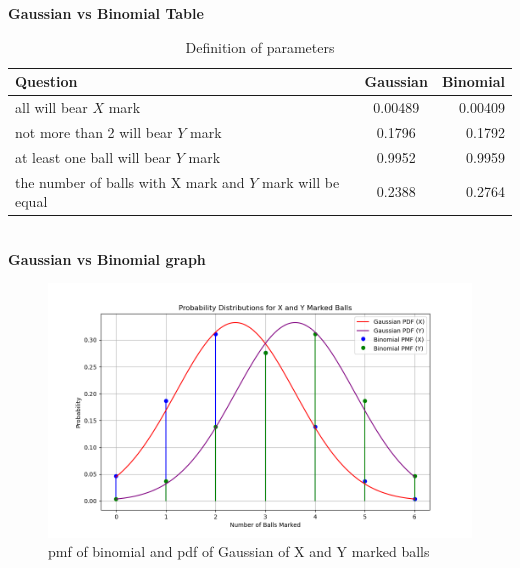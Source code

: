 \documentclass[journal,12pt,twocolumn]{IEEEtran}
\theoremstyle{remark}
\begin{document}
\textbf{Gaussian vs Binomial Table}
\begin{table}[!ht]
\centering
\begin{tabular}{|l|c|r|}
    \hline
    Question & Gaussian & Binomial\\
    \hline
    all will bear $X$ mark & 0.00489 &0.00409\\
    \hline
   not more than 2 will bear $Y$ mark & 0.1796 & 0.1792 \\
    \hline
     at least one ball will bear $Y$ mark &  0.9952& 0.9959 \\
    \hline
    the number of balls with X mark and $Y$ mark will be equal& 0.2388 & 0.2764\\
    \hline
\end{tabular}
\caption{Definition of parameters}
\end{table}
\\
\textbf{Gaussian vs Binomial graph}
\begin{figure}[!ht]
\centering
\includegraphics[width=\columnwidth]{ncert/9/3/17/figs/Fig1.png}
\caption{pmf of binomial and pdf of Gaussian of X and Y marked balls}
\end{figure}
\end{document}
